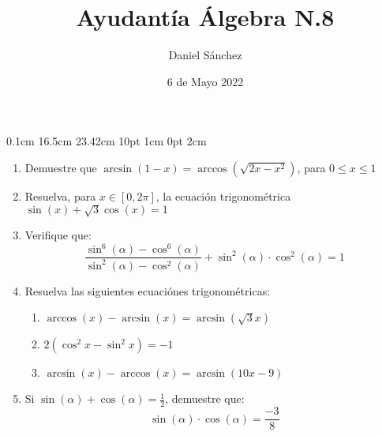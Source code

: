 \documentclass[12pt]{article}
\newcommand{\D}{\displaystyle}
\begin{document}
\setmargins{2.5cm}
{0.1cm}
{16.5cm}
{23.42cm}
{10pt}
{1cm}
{0pt}
{2cm}

\title{Ayudant\'ia \'Algebra N.8}
\date{6 de Mayo 2022}
\author{Daniel S\'anchez}
\maketitle

\begin{enumerate}
      \item Demuestre que $\D \arcsin(1-x)=\arccos(\sqrt{2x-x^2})$, para $0 \leq x \leq 1$
      \item Resuelva, para $x \in [0,2\pi]$, la ecuaci\'on trigonom\'etrica $\sin(x) + \sqrt{3}\cos(x)=1$
      \item Verifique que:
            $$\frac{\sin^6(\alpha) - \cos^6(\alpha)}{\sin^2(\alpha) - \cos^2(\alpha)} + \sin^2(\alpha)\cdot \cos^2(\alpha) = 1$$
      \item Resuelva las siguientes ecuaci\'ones trigonom\'etricas:
            \begin{enumerate}
                  \item $\arccos(x) - \arcsin(x) = \arcsin(\sqrt{3}x)$
                  \item $2(\cos^2x-\sin^2x)= -1$
                  \item $\arcsin(x) - \arccos(x) = \arcsin(10x-9)$
            \end{enumerate}
      \item Si $\D \sin(\alpha) + \cos(\alpha) = \frac{1}{2}$, demuestre que:
            $$\sin(\alpha)\cdot \cos(\alpha) = \frac{-3}{8}$$
            
\end{enumerate}
\end{document}
